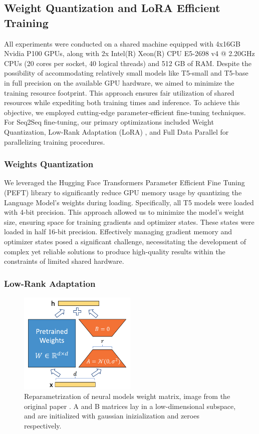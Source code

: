\documentclass{article}
\begin{document}
\subsection{Weight Quantization and LoRA Efficient Training}

All experiments were conducted on a shared machine equipped with 4x16GB Nvidia P100 GPUs, along with 2x Intel(R) Xeon(R) CPU E5-2698 v4 @ 2.20GHz CPUs (20 cores per socket, 40 logical threads) and 512 GB of RAM. Despite the possibility of accommodating relatively small models like T5-small and T5-base in full precision on the available GPU hardware, we aimed to minimize the training resource footprint. This approach ensures fair utilization of shared resources while expediting both training times and inference.
To achieve this objective, we employed cutting-edge parameter-efficient fine-tuning techniques. For Seq2Seq fine-tuning, our primary optimizations included Weight Quantization, Low-Rank Adaptation (LoRA) \cite{hu2021lora}, and Full Data Parallel for parallelizing training procedures.

\subsubsection{Weights Quantization}

We leveraged the Hugging Face Transformers Parameter Efficient Fine Tuning (PEFT) library to significantly reduce GPU memory usage by quantizing the Language Model's weights during loading. Specifically, all T5 models were loaded with 4-bit precision. This approach allowed us to minimize the model's weight size, ensuring space for training gradients and optimizer states. These states were loaded in half 16-bit precision. Effectively managing gradient memory and optimizer states posed a significant challenge, necessitating the development of complex yet reliable solutions to produce high-quality results within the constraints of limited shared hardware.

\subsubsection{Low-Rank Adaptation}
\begin{figure}[htbp]
    \centering
    \includegraphics[width=0.5\textwidth]{assets/lora.png}
    \caption{Reparametrization of neural models weight matrix, image from the original paper \cite{hu2021lora}. A and B matrices lay in a low-dimensional subspace, and are initialized with gaussian inizialization and zeroes respectively.}
    \label{fig:lorafig}
\end{figure}
\end{document}

